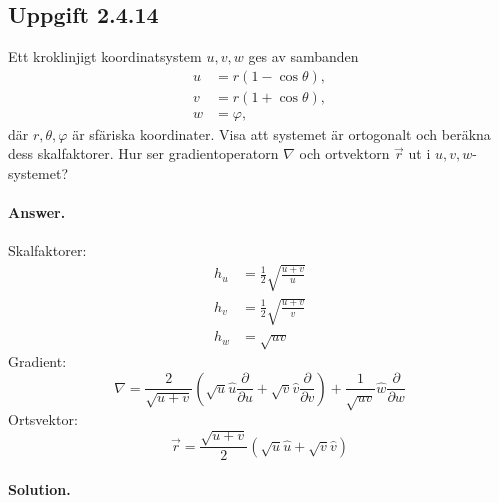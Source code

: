 \documentclass[%
oneside,                 %
final,                   %
10pt]{article}
\newenvironment{doconceexercise}{}{}
\newcounter{doconceexercisecounter}
\begin{document}
\begin{doconceexercise}

\subsection*{Uppgift 2.4.14}
\label{problem:2.14}

Ett kroklinjigt koordinatsystem $u,v,w$ ges av sambanden 
\begin{align}
    u&=r(1-\cos\theta),\nonumber\\
    v&=r(1+\cos\theta),\label{uvw}\\
    w&=\varphi,\nonumber
\end{align}
där $r,\theta,\varphi$ är sfäriska koordinater. Visa att systemet är ortogonalt och beräkna dess skalfaktorer. Hur ser gradientoperatorn $\nabla$ och ortvektorn $\vec r$ ut i $u,v,w$-systemet?


\paragraph{Answer.}
Skalfaktorer:
\begin{align*}
h_u  &=  \frac{1}{2} \sqrt{\frac{u+v}{u}} \\
h_v  &=  \frac{1}{2} \sqrt{\frac{u+v}{v}} \\
h_w  &=  \sqrt{uv}
\end{align*}
Gradient: 
\begin{equation*}
\nabla = \frac{2}{\sqrt{u+v}}\left(\sqrt{u} \hat u
\frac{\partial}{\partial u} + \sqrt{v} \hat v
\frac{\partial}{\partial v}\right) + \frac{1}{\sqrt{uv}} \hat w
\frac{\partial}{\partial w}
\end{equation*}
Ortsvektor: 
\begin{equation*}
\vec{r} = \frac{\sqrt{u+v}}{2}(\sqrt{u} \hat u + \sqrt{v} \hat v)
\end{equation*}



\paragraph{Solution.}

\end{doconceexercise}
\end{document}
